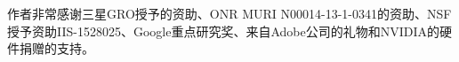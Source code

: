  作者非常感谢三星GRO授予的资助、ONR MURI N00014-13-1-0341的资助、NSF授予资助IIS-1528025、Google重点研究奖、来自Adobe公司的礼物和NVIDIA的硬件捐赠的支持。